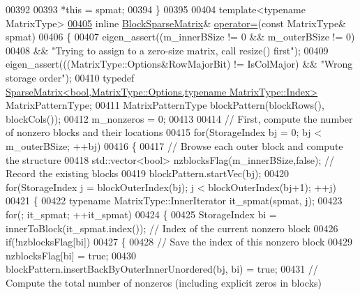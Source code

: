 \begin{DoxyCode}
00392 
00393       *\textcolor{keyword}{this} = spmat;
00394     \}
00395 
00404     \textcolor{keyword}{template}<\textcolor{keyword}{typename} MatrixType>
\hyperlink{group___sparse_core___module_a5c5479fd38867538383e092a1d90db5a}{00405}     \textcolor{keyword}{inline} \hyperlink{group___sparse_core___module_class_eigen_1_1_block_sparse_matrix}{BlockSparseMatrix}& \hyperlink{group___sparse_core___module_a5c5479fd38867538383e092a1d90db5a}{operator=}(\textcolor{keyword}{const} MatrixType& spmat)
00406     \{
00407       eigen\_assert((m\_innerBSize != 0 && m\_outerBSize != 0)
00408                    && \textcolor{stringliteral}{"Trying to assign to a zero-size matrix, call resize() first"});
00409       eigen\_assert(((MatrixType::Options&RowMajorBit) != IsColMajor) && \textcolor{stringliteral}{"Wrong storage order"});
00410       \textcolor{keyword}{typedef} \hyperlink{group___sparse_core___module_class_eigen_1_1_sparse_matrix}{SparseMatrix<bool,MatrixType::Options,typename MatrixType::Index>}
       MatrixPatternType;
00411       MatrixPatternType  blockPattern(blockRows(), blockCols());
00412       m\_nonzeros = 0;
00413 
00414       \textcolor{comment}{// First, compute the number of nonzero blocks and their locations}
00415       \textcolor{keywordflow}{for}(StorageIndex bj = 0; bj < m\_outerBSize; ++bj)
00416       \{
00417         \textcolor{comment}{// Browse each outer block and compute the structure}
00418         std::vector<bool> nzblocksFlag(m\_innerBSize,\textcolor{keyword}{false});  \textcolor{comment}{// Record the existing blocks}
00419         blockPattern.startVec(bj);
00420         \textcolor{keywordflow}{for}(StorageIndex j = blockOuterIndex(bj); j < blockOuterIndex(bj+1); ++j)
00421         \{
00422           \textcolor{keyword}{typename} MatrixType::InnerIterator it\_spmat(spmat, j);
00423           \textcolor{keywordflow}{for}(; it\_spmat; ++it\_spmat)
00424           \{
00425             StorageIndex bi = innerToBlock(it\_spmat.index()); \textcolor{comment}{// Index of the current nonzero block}
00426             \textcolor{keywordflow}{if}(!nzblocksFlag[bi])
00427             \{
00428               \textcolor{comment}{// Save the index of this nonzero block}
00429               nzblocksFlag[bi] = \textcolor{keyword}{true};
00430               blockPattern.insertBackByOuterInnerUnordered(bj, bi) = \textcolor{keyword}{true};
00431               \textcolor{comment}{// Compute the total number of nonzeros (including explicit zeros in blocks)}

\end{DoxyCode}
